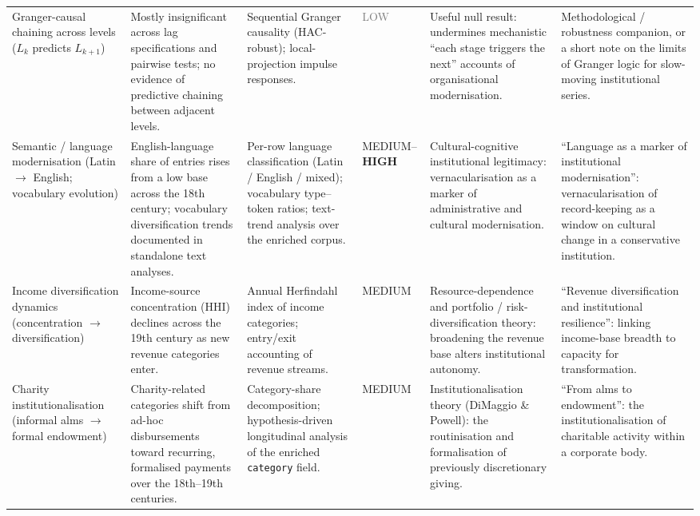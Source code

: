 \documentclass[11pt]{article}
\newcommand{\confhigh}[1]{\textcolor{green!45!black}{\textbf{#1}}}
\newcommand{\confmed}[1]{\textcolor{blue!55!black}{#1}}
\newcommand{\conflow}[1]{\textcolor{gray}{#1}}
\begin{document}
\begin{longtable}{P{2.4cm} P{4.2cm} P{3.2cm} P{1.5cm} P{4.0cm} P{4.2cm}}
Granger-causal chaining across levels ($L_k$ predicts $L_{k+1}$)
& Mostly insignificant across lag specifications and pairwise tests; no evidence of predictive chaining between adjacent levels.
& Sequential Granger causality (HAC-robust); local-projection impulse responses.
& \conflow{LOW}
& Useful null result: undermines mechanistic ``each stage triggers the next'' accounts of organisational modernisation.
& Methodological / robustness companion, or a short note on the limits of Granger logic for slow-moving institutional series. \\

Semantic / language modernisation (Latin $\rightarrow$ English; vocabulary evolution)
& English-language share of entries rises from a low base across the 18th century; vocabulary diversification trends documented in standalone text analyses.
& Per-row language classification (Latin / English / mixed); vocabulary type--token ratios; text-trend analysis over the enriched corpus.
& \confmed{MEDIUM}--\confhigh{HIGH}
& Cultural-cognitive institutional legitimacy: vernacularisation as a marker of administrative and cultural modernisation.
& ``Language as a marker of institutional modernisation'': vernacularisation of record-keeping as a window on cultural change in a conservative institution. \\

Income diversification dynamics (concentration $\rightarrow$ diversification)
& Income-source concentration (HHI) declines across the 19th century as new revenue categories enter.
& Annual Herfindahl index of income categories; entry/exit accounting of revenue streams.
& \confmed{MEDIUM}
& Resource-dependence and portfolio / risk-diversification theory: broadening the revenue base alters institutional autonomy.
& ``Revenue diversification and institutional resilience'': linking income-base breadth to capacity for transformation. \\

Charity institutionalisation (informal alms $\rightarrow$ formal endowment)
& Charity-related categories shift from ad-hoc disbursements toward recurring, formalised payments over the 18th--19th centuries.
& Category-share decomposition; hypothesis-driven longitudinal analysis of the enriched \texttt{category} field.
& \confmed{MEDIUM}
& Institutionalisation theory (DiMaggio \& Powell): the routinisation and formalisation of previously discretionary giving.
& ``From alms to endowment'': the institutionalisation of charitable activity within a corporate body. \\


\end{longtable}
\end{document}
